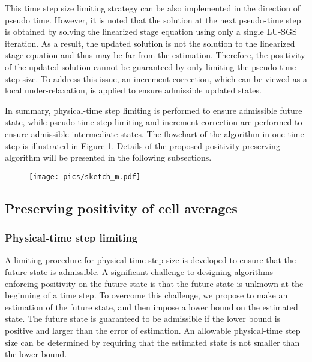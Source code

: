 This time step size limiting strategy can be also implemented in the direction of pseudo time. However, it is noted that the solution at the next pseudo-time step is obtained by solving the linearized stage equation using only a single LU-SGS iteration. As a result, the updated solution is not the solution to the linearized stage equation and thus may be far from the estimation. Therefore, the positivity of the updated solution cannot be guaranteed by only limiting the pseudo-time step size. To address this issue, an increment correction, which can be viewed as a local under-relaxation, is applied to ensure admissible updated states. 


In summary, physical-time step limiting is performed to ensure admissible future state, while pseudo-time step limiting and increment correction are performed to ensure admissible intermediate states. The flowchart of the algorithm in one time step is illustrated in Figure \ref{fig:sketch}. Details of the proposed positivity-preserving algorithm will be presented in the following subsections.

\begin{figure}[htbp!]
    \centering
    \texttt{[image: pics/sketch\_m.pdf]}
    \caption{}
    \label{fig:sketch}
\end{figure}

\subsection{Preserving positivity of cell averages}
\subsubsection{Physical-time step limiting}
\label{ssec:physical-limiting}
A limiting procedure for physical-time step size is developed to ensure that the future state is admissible. A significant challenge to designing algorithms enforcing positivity on the future state is that the future state is unknown at the beginning of a time step. To overcome this challenge, we propose to make an estimation of the future state, and then impose a lower bound on the estimated state. The future state is guaranteed to be admissible if the lower bound is positive and larger than the error of estimation. An allowable physical-time step size can be determined by requiring that the estimated state is not smaller than the lower bound. 

